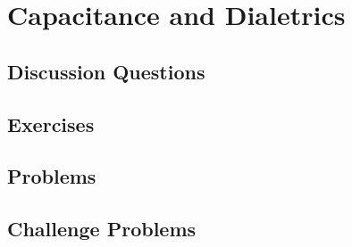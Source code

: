 
\chapter{Capacitance and Dialetrics}

\section{Discussion Questions}

\section{Exercises}

\section{Problems}

\section{Challenge Problems}
